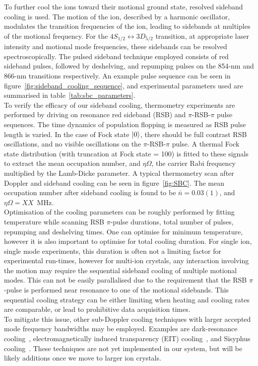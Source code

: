     To further cool the ions toward their motional ground state, resolved
    sideband cooling is used. The motion of the ion, described by a harmonic oscillator,
    modulates the transition frequencies of the ion, leading to sidebands at
    multiples of the motional frequency. For the $4S_{1/2} \leftrightarrow
    3D_{5/2}$ transition, at appropriate laser intensity and motional mode
    frequencies, these sidebands can be resolved spectroscopically. The pulsed
    sideband technique employed consists of red sideband pulses, followed by
    deshelving, and repumping pulses on the 854-nm and 866-nm transitions
    respectively. An example pulse sequence can be seen in
    figure~\ref{fig:sideband_cooling_sequence}, and experimental parameters used are summarised in table~\ref{tab:sbc_parameters}. \\
    To verify the efficacy of our sideband cooling, thermometry
    experiments are performed by driving on resonance red sideband (RSB) and $\pi$-RSB-$\pi$ pulse
    sequences. The time dynamics of population flopping is measured as RSB
    pulse length is varied. In the case of Fock state $\ket{0}$, there should be full contrast 
    RSB oscillations, and no visible oscillations on the $\pi$-RSB-$\pi$ pulse. A thermal
    Fock state distribution (with truncation at Fock state = 100) is fitted to these
    signals to extract the mean occupation number, and $\eta\Omega$, the carrier
    Rabi frequency multiplied by the Lamb-Dicke parameter. A typical thermometry
    scan after Doppler and sideband cooling can be seen in
    figure~\ref{fig:SBC}. The mean occupation
    number after sideband cooling is found to be $\bar{n} = 0.03(1)$, and $\eta\Omega =
    XX$~\unit{\MHz}.\\
    Optimisation of the cooling parameters can be roughly performed by fitting
    temperature while scanning RSB $\pi$-pulse durations, total number of pulses,
    repumping and deshelving times. One can optimise for minimum temperature,
    however it is also important to optimise for total cooling duration. For
    single ion, single mode experiments, this duration is often not a limiting factor for experimental run-times,
    however for multi-ion crystals, any interaction involving the motion may
    require the sequential sideband cooling of multiple motional modes. This can
    not be easily parallalised due to the requirement that the RSB $\pi$-pulse is
    performed near resonance to one of the motional sidebands. This sequential
    cooling strategy can be either limiting when heating and cooling rates are
    comparable, or lead to prohibitive data acquisition times.\\
    To mitigate this issue, other sub-Doppler cooling techniques with larger
    accepted mode frequency bandwidths may be employed. Examples are dark-resonance
    cooling~\cite{}, electromagnetically induced transparency (EIT) cooling~\cite{}, and
    Sisyphus cooling~\cite{}. These techniques are not yet implemented in our system,
    but will be likely additions once we move to larger ion crystals.\\

